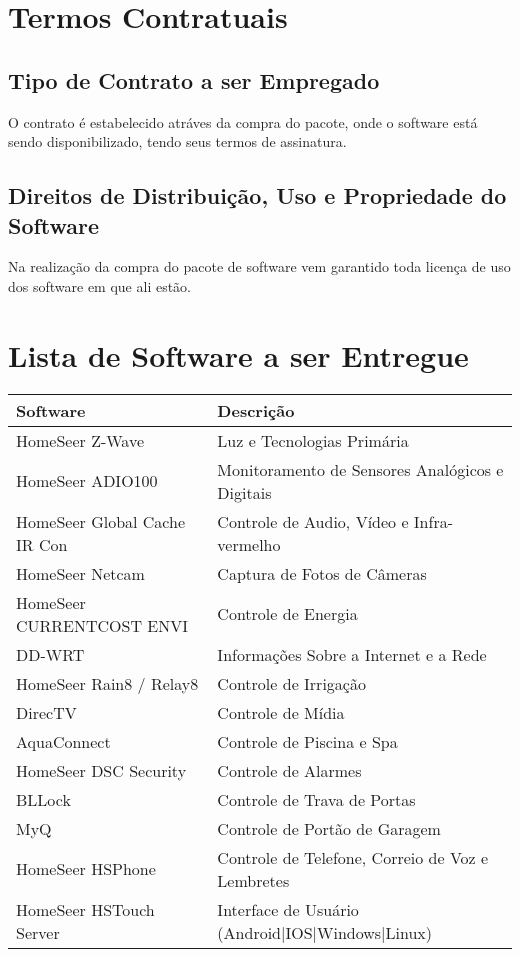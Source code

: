 \section{Termos Contratuais}

\subsection{Tipo de Contrato a ser Empregado}
	O contrato é estabelecido atráves da compra do pacote, onde o software está sendo disponibilizado,
	tendo seus termos de assinatura.

\subsection{Direitos de Distribuição, Uso e Propriedade do Software}
	Na realização da compra do pacote de software vem garantido toda licença de uso dos software em que ali estão.

\section{Lista de Software a ser Entregue}

\begin{tabular}{|l|l|}
	\hline
	\textbf{Software} & \textbf{Descrição}\tabularnewline
	\hline
	\hline
	HomeSeer Z-Wave & Luz e Tecnologias Primária\tabularnewline
	\hline
	HomeSeer ADIO100 & Monitoramento de Sensores Analógicos e Digitais\tabularnewline
	\hline
	HomeSeer Global Cache IR Con & Controle de Audio, Vídeo e Infra-vermelho\tabularnewline
	\hline
	HomeSeer Netcam & Captura de Fotos de Câmeras\tabularnewline
	\hline
	HomeSeer CURRENTCOST ENVI & Controle de Energia\tabularnewline
	\hline
	DD-WRT & Informações Sobre a Internet e a Rede\tabularnewline
	\hline
	HomeSeer Rain8 / Relay8 & Controle de Irrigação\tabularnewline
	\hline
	DirecTV & Controle de Mídia\tabularnewline
	\hline
	AquaConnect & Controle de Piscina e Spa\tabularnewline
	\hline
	HomeSeer DSC Security & Controle de Alarmes\tabularnewline
	\hline
	BLLock & Controle de Trava de Portas\tabularnewline
	\hline
	MyQ & Controle de Portão de Garagem\tabularnewline
	\hline
	HomeSeer HSPhone & Controle de Telefone, Correio de Voz e Lembretes\tabularnewline
	\hline
	HomeSeer HSTouch Server & Interface de Usuário (Android|IOS|Windows|Linux)\tabularnewline
	\hline
\end{tabular}


